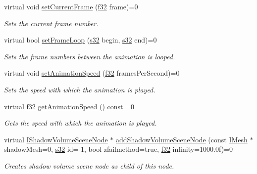\begin{DoxyCompactItemize}
virtual void \hyperlink{classirr_1_1scene_1_1IAnimatedMeshSceneNode_aff1c1e2270f4d3d94e58e7c130c575a4}{set\+Current\+Frame} (\hyperlink{namespaceirr_a0277be98d67dc26ff93b1a6a1d086b07}{f32} frame)=0
\begin{DoxyCompactList}\small\item\em Sets the current frame number. \end{DoxyCompactList}\item 
virtual bool \hyperlink{classirr_1_1scene_1_1IAnimatedMeshSceneNode_a900400fe375ca13f48876b84900ffddf}{set\+Frame\+Loop} (\hyperlink{namespaceirr_ac66849b7a6ed16e30ebede579f9b47c6}{s32} begin, \hyperlink{namespaceirr_ac66849b7a6ed16e30ebede579f9b47c6}{s32} end)=0
\begin{DoxyCompactList}\small\item\em Sets the frame numbers between the animation is looped. \end{DoxyCompactList}\item 
virtual void \hyperlink{classirr_1_1scene_1_1IAnimatedMeshSceneNode_a89ef2d20c6e9e83fdb861403c9698c4a}{set\+Animation\+Speed} (\hyperlink{namespaceirr_a0277be98d67dc26ff93b1a6a1d086b07}{f32} frames\+Per\+Second)=0
\begin{DoxyCompactList}\small\item\em Sets the speed with which the animation is played. \end{DoxyCompactList}\item 
virtual \hyperlink{namespaceirr_a0277be98d67dc26ff93b1a6a1d086b07}{f32} \hyperlink{classirr_1_1scene_1_1IAnimatedMeshSceneNode_a246c21ec2ae5b3a5cecc10f9cc3625c4}{get\+Animation\+Speed} () const =0
\begin{DoxyCompactList}\small\item\em Gets the speed with which the animation is played. \end{DoxyCompactList}\item 
virtual \hyperlink{classirr_1_1scene_1_1IShadowVolumeSceneNode}{I\+Shadow\+Volume\+Scene\+Node} $\ast$ \hyperlink{classirr_1_1scene_1_1IAnimatedMeshSceneNode_aaa4947ed5f7ba72870da37ee1fc17125}{add\+Shadow\+Volume\+Scene\+Node} (const \hyperlink{classirr_1_1scene_1_1IMesh}{I\+Mesh} $\ast$shadow\+Mesh=0, \hyperlink{namespaceirr_ac66849b7a6ed16e30ebede579f9b47c6}{s32} id=-\/1, bool zfailmethod=true, \hyperlink{namespaceirr_a0277be98d67dc26ff93b1a6a1d086b07}{f32} infinity=1000.\+0f)=0
\begin{DoxyCompactList}\small\item\em Creates shadow volume scene node as child of this node. \end{DoxyCompactList}\item 

\end{DoxyCompactItemize}
